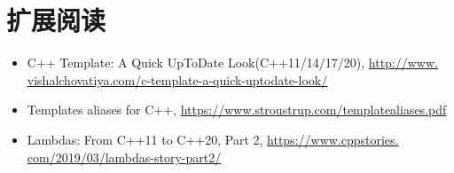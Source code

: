 \section{扩展阅读}
\begin{itemize}
  \item C++ Template: A Quick UpToDate Look(C++11/14/17/20), \url{http://www.
vishalchovatiya.com/c-template-a-quick-uptodate-look/}
  \item Templates aliases for C++, \url{https://www.stroustrup.com/templatealiases.pdf}
  \item Lambdas: From C++11 to C++20, Part 2, \url{https://www.cppstories.
com/2019/03/lambdas-story-part2/}
\end{itemize}